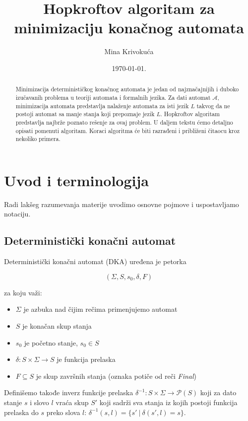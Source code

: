 \documentclass[a4paper]{article}
\title{Hopkroftov algoritam za minimizaciju kona\v cnog automata}
\author{Mina Krivoku\'ca}
\date{\today.}
\begin{document}
\maketitle
\tableofcontents

\begin{abstract}
Minimizacija determinističkog konačnog automata je jedan od najznačajnijih i duboko izučavanih problema u teoriji automata i formalnih jezika. Za dati automat $\mathcal{A}$, minimizacija automata predstavlja nalaženje automata za isti jezik $L$ takvog da ne postoji automat sa manje stanja koji prepoznaje jezik $L$. Hopkroftov algoritam predstavlja najbrže poznato rešenje za ovaj problem. U daljem tekstu ćemo detaljno opisati pomenuti algoritam. Koraci algoritma će biti razrađeni i približeni čitaocu kroz nekoliko primera. 
\end{abstract}

\newpage

\section{Uvod i terminologija}
Radi lakšeg razumevanja materije uvodimo osnovne pojmove i uspostavljamo notaciju.

\subsection{Deterministički konačni automat}

Deterministički konačni automat (DKA) uređena je petorka

$$(\Sigma, S, s_{0}, \delta, F)$$

za koju važi:

\begin{itemize}
\item $\Sigma$ je azbuka nad čijim rečima primenjujemo automat
\item $S$ je konačan skup stanja
\item $s_{0}$ je početno stanje, $s_{0} \in S$
\item $\delta : S \times \Sigma \rightarrow S$ je funkcija prelaska
\item $F \subseteq S$ je skup završnih stanja (oznaka potiče od reči \textit{Final})
\end{itemize}

\vspace{5pt}

Definišemo takođe inverz funkcije prelaska $\delta^{-1} : S \times \Sigma \rightarrow \mathcal{P}(S)$ koji za dato stanje $s$ i slovo $l$ vraća skup $S'$ koji sadrži sva stanja iz kojih postoji funkcija prelaska do $s$ preko slova $l$: $\delta^{-1} (s, l) = \{ s' \ | \  \delta (s', l) = s \}$.
\end{document}
